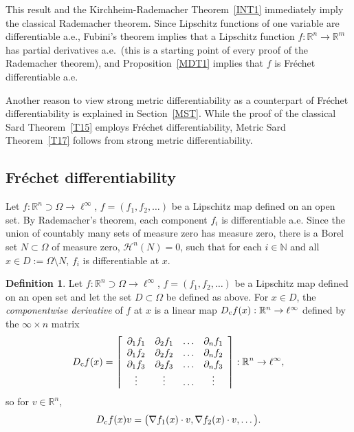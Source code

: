 \documentclass[12pt,leqno]{amsart}
\theoremstyle{definition}
\newtheorem{definition}[theorem]{Definition}
\newcommand{\bbbn}{\mathbb N}
\newcommand{\bbbr}{\mathbb R}
\def\H{{\mathcal H}}
\numberwithin{theorem}{section} \numberwithin{equation}{section}
\begin{document}
This result and the Kirchheim-Rademacher Theorem~\ref{INT1} immediately imply the classical Rademacher theorem. Since Lipschitz functions of one variable are differentiable a.e., Fubini's theorem implies that a Lipschitz function $f:\bbbr^n\to\bbbr^m$ has partial derivatives a.e.\ (this is a starting point of every proof of the Rademacher theorem), and Proposition~\ref{MDT1} implies that $f$ is Fr\'echet differentiable a.e.

Another reason to view strong metric differentiability as a counterpart of Fr\'echet differentiability is explained in Section~\ref{MST}. While the proof of the classical Sard Theorem~\ref{T15} employs Fr\'echet differentiability, Metric Sard Theorem~\ref{T17} follows from strong metric differentiability.


\subsection{Fr\'echet differentiability}
\label{MFD}
Let $f:\bbbr^n\supset\Omega\to\ell^\infty$, $f=(f_1,f_2,\ldots)$ be a Lipschitz map defined on an open set.
By Rademacher's theorem, each component $f_i$ is differentiable a.e. Since the union of countably many sets of measure zero has measure zero, there is a Borel set $N\subset\Omega$ of measure zero, $\H^n(N)=0$, such that for each $i\in\bbbn$ and all $x\in D:=\Omega\setminus N$, $f_i$ is differentiable at $x$.
\begin{definition}
\label{D1}
Let $f:\bbbr^n\supset\Omega\to\ell^\infty$, $f=(f_1,f_2,\ldots)$ be a Lipschitz map defined on an open set and let the set $D\subset\Omega$ be defined as above. For $x\in D$, the {\em componentwise derivative} of $f$ at $x$ is a linear map $D_{\rm c}f(x):\bbbr^n\to\ell^\infty$ defined by the $\infty\times n$ matrix
$$
D_{\rm c}f(x)=
\left\lceil
\begin{array}{cccc}
\partial_1f_1 & \partial_2f_1 & \ldots & \partial_nf_1\\
\partial_1f_2 & \partial_2f_2 & \ldots & \partial_nf_2\\
\partial_1f_3 & \partial_2f_3 & \ldots & \partial_nf_3\\
\vdots & \vdots & \ldots & \vdots
\end{array}
\right\rceil:\bbbr^n\to\ell^\infty,
$$
so for $v\in\bbbr^n$,
$$
D_{\rm c}f(x)v=\big(\nabla f_1(x)\cdot v,\nabla f_2(x)\cdot v,\ldots\big).
$$
\end{definition}
\end{document}
